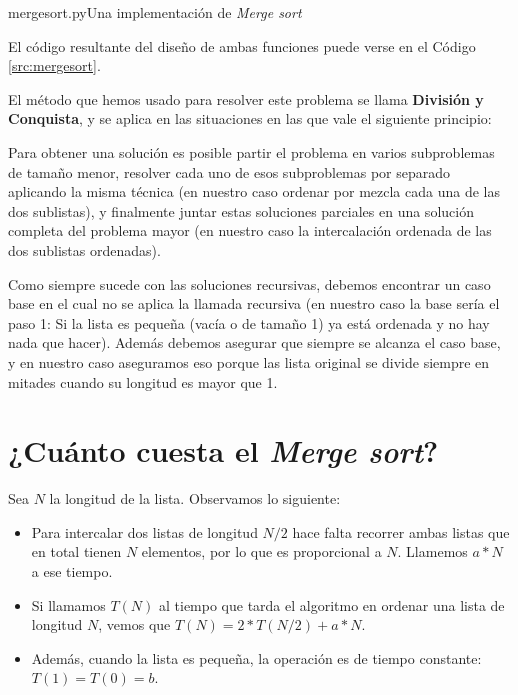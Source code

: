 \begin{codigo}{mergesort.py}{Una implementación de {\it Merge sort}}

\label{src:mergesort}
\end{codigo}	

El código resultante del diseño de ambas funciones puede verse en el Código
\ref{src:mergesort}. 

\begin{sabias_que}
El método que hemos usado para resolver este problema se llama {\bf División y
Conquista}, y se aplica en las situaciones en las que vale el siguiente
principio:

Para obtener una solución es posible partir el problema en varios subproblemas
de tamaño menor, resolver cada uno de esos subproblemas por separado aplicando
la misma técnica (en nuestro caso ordenar por mezcla cada una de las dos
sublistas), y finalmente juntar estas soluciones parciales en una solución
completa del problema mayor (en nuestro caso la intercalación ordenada de las
dos sublistas ordenadas).

Como siempre sucede con las soluciones recursivas, debemos encontrar un caso
base en el cual no se aplica la llamada recursiva (en nuestro caso la base
sería el paso 1: Si la lista es pequeña (vacía o de tamaño 1) ya está ordenada
y no hay nada que hacer). Además debemos asegurar que siempre se alcanza el
caso base, y en nuestro caso aseguramos eso porque las lista original se divide
siempre en mitades cuando su longitud es mayor que 1.
\end{sabias_que}

\section{¿Cuánto cuesta el {\it Merge sort}?}
Sea $N$ la longitud de la lista. Observamos lo siguiente:
\begin{itemize}

\item Para intercalar dos listas de longitud $N/2$ hace falta recorrer
ambas listas que en total tienen $N$ elementos, por lo que es proporcional
a $N$. Llamemos $a * N$ a ese tiempo.

\item Si llamamos $T(N)$ al tiempo que tarda el algoritmo en ordenar
una lista de longitud $N$, vemos que $T(N) = 2 * T(N/2) + a * N$.

\item Además, cuando la lista es pequeña, la operación es de tiempo
constante: $T(1) = T(0) = b$.
\end{itemize}

